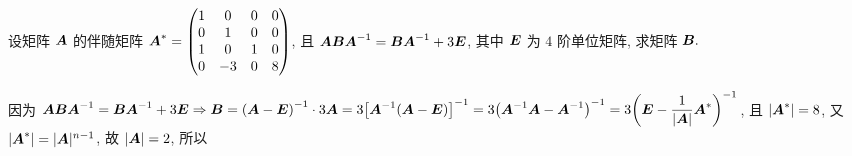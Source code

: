 \begin{example}
    设矩阵 $\vb*{A}$ 的伴随矩阵 $\vb*{A}^*=\begin{pmatrix}
            1 & 0  & 0 & 0 \\
            0 & 1  & 0 & 0 \\
            1 & 0  & 1 & 0 \\
            0 & -3 & 0 & 8
        \end{pmatrix}$, 且 $\vb*{ABA}^{-1}=\vb*{BA}^{-1}+3\vb*{E}$, 其中 $\vb*{E}$ 为 $4$ 阶单位矩阵, 求矩阵 $\vb*{B}.$
    \label{ABA}
\end{example}
\begin{solution}
    因为 $\vb*{ABA}^{-1}=\vb*{BA}^{-1}+3\vb*{E}\Rightarrow \vb*{B}=\qty(\vb*{A}-\vb*{E})^{-1}\cdot 3\vb*{A}=3\qty[\vb*{A}^{-1}\qty(\vb*{A}-\vb*{E})]^{-1}=3\qty(\vb*{A}^{-1}\vb*{A}-\vb*{A}^{-1})^{-1}=3\qty(\vb*{E}-\dfrac{1}{|\vb*{A}|}\vb*{A}^*)^{-1}$,
    且 $|\vb*{A}^*|=8$, 又 $|\vb*{A}^*|=|\vb*{A}|^{n-1}$, 故 $|\vb*{A}|=2$, 所以
\end{solution}
